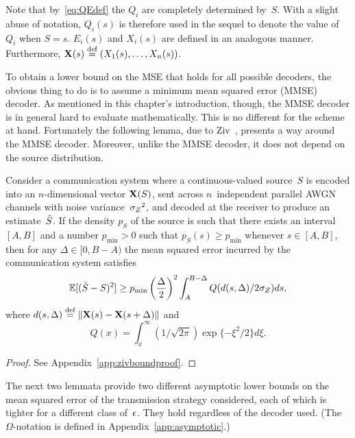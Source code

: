 \begin{remark}
  \label{rem:functionnotation}
  Note that by~\eqref{eq:QEdef} the $Q_i$ are completely determined by~$S$.
  With a slight abuse of notation, $Q_i(s)$ is therefore used in the sequel to
  denote the value of~$Q_i$ when $S = s$. $E_i(s)$ and $X_i(s)$ are defined in
  an analogous manner. Furthermore, $\mathbf{X}(s) \stackrel{\text{def}}{=} (X_1(s), \dots, X_n(s))$.
\end{remark}


To obtain a lower bound on the MSE that holds for all possible decoders, the
obvious thing to do is to assume a minimum mean squared error (MMSE) decoder. As
mentioned in this chapter's introduction, though, the MMSE decoder is in general
hard to evaluate mathematically. This is no different for the scheme at hand.
Fortunately the following lemma, due to Ziv~\cite{Ziv1970}, presents a way
around the MMSE decoder. Moreover, unlike the MMSE decoder, it does not depend
on the source distribution.


\begin{lemma}
  \label{lem:zivbound}
  Consider a communication system where a con\-tin\-u\-ous-valued source~$S$ is
  encoded into an $n$-dimensional vector $\mathbf{X}(S)$, sent across $n$~independent
  parallel AWGN channels with noise variance~${{\sigma_Z}^2}$, and decoded at the receiver
  to produce an estimate~${\hat{S}}$.  If the density $p_S$ of the source is such that
  there exists an interval $[A,B]$ and a number $p_{\min} > 0$ such that $p_S(s)
  \ge p_{\min}$ whenever $s \in [A,B]$, then for any $\Delta \in [0,B-A)$ the
  mean squared error incurred by the communication system satisfies
  \begin{equation}
    \label{eq:zivbound}
    \mathbb{E}[({\hat{S}} - S)^2] \ge p_{\min} \left(\frac{\Delta}{2} \right)^2 
    \int_A^{B-\Delta} Q(d(s, \Delta) / 2 {\sigma_Z}) ds,
  \end{equation}
  where $d(s, \Delta) \stackrel{\text{def}}{=} \|\mathbf{X}(s) - \mathbf{X}(s+\Delta)\|$ and 
  \[Q(x) = \int_x^{\infty} (1/\sqrt{2\pi}) \exp\{-\xi^2/2\} d\xi.\]
\end{lemma}

\begin{proof}
  See Appendix~\ref{app:zivboundproof}.
\end{proof}

The next two lemmata provide two different asymptotic lower bounds on the
mean squared error of the transmission strategy considered, each of which is
tighter for a different class of~$\epsilon$. They hold regardless of the decoder used.
(The $\Omega$-notation is defined in Appendix~\ref{app:asymptotic}.)

